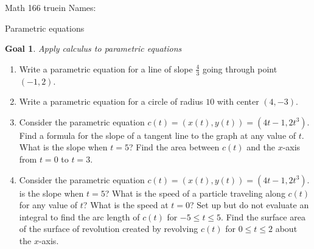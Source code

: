 \documentclass[12pt]{article}
\newtheorem*{goal}{Goal}
\begin{document}
\pagestyle{empty} %

\noindent
{Math 166  truein  Names:\ \hrulefill}

\noindent
{Parametric equations}

\medskip

\begin{goal} \rm
Apply calculus to parametric equations
\end{goal}

\begin{enumerate}
\item Write a parametric equation for a line of slope $\frac{4}{3}$ going through point $(-1, 2)$. 
\vfill
\item Write a parametric equation for a circle of radius $10$ with center $(4, -3)$.
\vfill
\pagebreak
\item  Consider the parametric equation $c(t) = (x(t), y(t)) = (4t -1, 2t^3)$.
\subitem[a] Find a formula for the slope of a tangent line to the graph at any value of $t$. What
is the slope when $t = 5$?
\vfill
\subitem[b] Find the area between $c(t)$ and the $x$-axis from $t = 0$ to $t = 3$.
\vfill
\pagebreak
\item  Consider the parametric equation $c(t) = (x(t), y(t)) = (4t -1, 2t^3)$.
is the slope when $t = 5$?
\subitem[a] What is the speed of a particle traveling along $c(t)$ for any value of $t$? What is the speed at $t = 0$?
\vfill
\subitem[b] Set up but do not evaluate an integral to find the arc length of $c(t)$ for $-5 \leq t \leq 5$.
\vfill
\subitem[c] Find the surface area of the surface of revolution created by revolving $c(t)$ for $0 \leq t \leq 2$ about the $x$-axis.
\vfill
\end{enumerate} 
\end{document}

